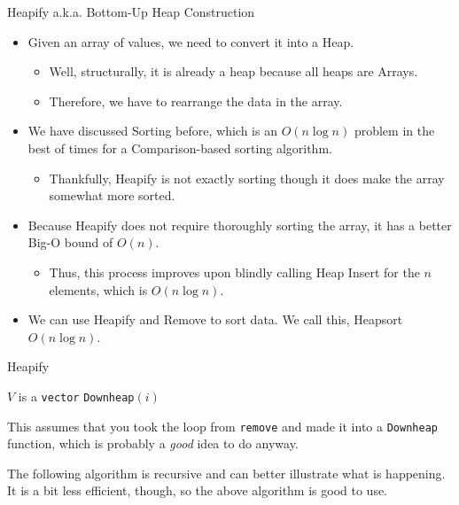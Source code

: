 \documentclass[10pt,compress]{beamer}
\begin{document}
\begin{frame}{Heapify a.k.a. Bottom-Up Heap Construction}
  \begin{itemize}
    \item Given an array of values, we need to convert it into a Heap.
          \begin{itemize}
            \item Well, structurally, it is already a heap because all heaps are Arrays.
            \item Therefore, we have to rearrange the data in the array.
          \end{itemize}
    \item We have discussed Sorting before, which is an $O(n\log n)$ problem in the best of times for a Comparison-based sorting algorithm.
          \begin{itemize}
            \item Thankfully, Heapify is not exactly sorting though it does make the array somewhat more sorted.
          \end{itemize}
    \item Because Heapify does not require thoroughly sorting the array, it has a better Big-O bound of $O(n)$.
          \begin{itemize}
            \item Thus, this process improves upon blindly calling Heap Insert for the $n$ elements, which is $O(n\log n)$.
          \end{itemize}
    \item We can use Heapify and Remove to sort data. We call this, Heapsort $O(n\log n)$.
  \end{itemize}
\end{frame}

\begin{frame}{Heapify}
  \begin{algorithm}[H]
    \caption{Bottom Up Heap Construction}\label{alg:heapify}
    \begin{algorithmic}
      \Require $V$ is a \texttt{vector}
       
      \State \texttt{Downheap}$(i)$ 
      \EndFor
    \end{algorithmic}
  \end{algorithm}
  This assumes that you took the loop from \texttt{remove} and made it into a \texttt{Downheap} function, which is probably a \emph{good} idea to do anyway.

  The following algorithm is recursive and can better illustrate what is happening. It is a bit less efficient, though, so the above algorithm is good to use.
\end{frame}
\end{document}
